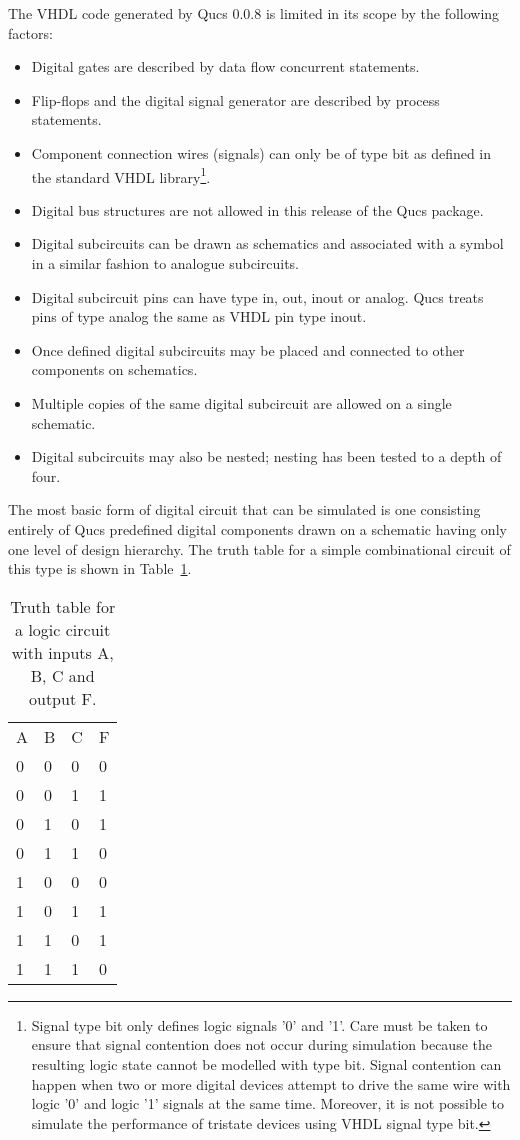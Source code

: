 \addvspace{12pt}

The VHDL code generated by Qucs 0.0.8 is limited in its scope by the
following factors:
\begin{itemize}
\item
Digital gates are described by data flow concurrent statements.
\item
Flip-flops and the digital signal generator are described by process
statements.
\item
Component connection wires (signals) can only be of type bit as
defined in the standard VHDL library\footnote{Signal type bit only
defines logic signals '0' and '1'.  Care must be taken to ensure that
signal contention does not occur during simulation because the
resulting logic state cannot be modelled with type bit. Signal
contention can happen when two or more digital devices attempt to
drive the same wire with logic '0' and logic '1' signals at the same
time.  Moreover, it is not possible to simulate the performance of
tristate devices using VHDL signal type bit.}.
\item
Digital bus structures are not allowed in this release of the Qucs
package.
\item
Digital subcircuits can be drawn as schematics and associated with a
symbol in a similar fashion to analogue subcircuits.
\item
Digital subcircuit pins can have type in, out, inout or analog.  Qucs
treats pins of type analog the same as VHDL pin type inout.
\item
Once defined digital subcircuits may be placed and connected to other
components on schematics.
\item
Multiple copies of the same digital subcircuit are allowed on a single
schematic.
\item
Digital subcircuits may also be nested; nesting has been tested to a
depth of four.
\end{itemize}


The most basic form of digital circuit that can be simulated is one
consisting entirely of Qucs predefined digital components drawn on a
schematic having only one level of design hierarchy.  The truth table
for a simple combinational circuit of this type is shown in
Table~\ref{tab:tab1}.

\begin{table}
\centering
\begin{tabular}{llll}
A & B & C & F \\ 
0 & 0 & 0 & 0 \\ 
0 & 0 & 1 & 1 \\ 
0 & 1 & 0 & 1 \\ 
0 & 1 & 1 & 0 \\ 
1 & 0 & 0 & 0 \\ 
1 & 0 & 1 & 1 \\ 
1 & 1 & 0 & 1 \\ 
1 & 1 & 1 & 0
\end{tabular}
\caption{Truth table for a logic circuit with inputs A, B, C and output F.}
\label{tab:tab1}
\end{table}

